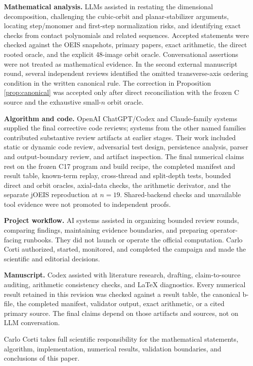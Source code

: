 \documentclass[11pt]{article}
\theoremstyle{definition}
\theoremstyle{remark}
\begin{document}
\textbf{Mathematical analysis.}
LLMs assisted in restating the dimensional decomposition, challenging the
cubic-orbit and planar-stabilizer arguments, locating step/monomer and
first-step normalization risks, and identifying exact checks from contact
polynomials and related sequences.  Accepted statements were checked against
the OEIS snapshots, primary papers, exact arithmetic, the direct rooted oracle,
and the explicit 48-image orbit oracle.  Conversational assertions were not
treated as mathematical evidence.  In the second external manuscript round,
several independent reviews identified the omitted transverse-axis ordering
condition in the written canonical rule.  The correction in Proposition~
\ref{prop:canonical} was accepted only after direct reconciliation with the
frozen C source and the exhaustive small-$n$ orbit oracle.

\textbf{Algorithm and code.}
OpenAI ChatGPT/Codex and Claude-family systems supplied the final corrective
code reviews; systems from the other named families contributed substantive
review artifacts at earlier stages.  Their work included static or dynamic
code review, adversarial test design, persistence analysis, parser and
output-boundary review, and artifact inspection.  The final numerical claims
rest on the frozen C17 program and build recipe, the completed manifest and result table,
known-term replay, cross-thread and split-depth tests, bounded direct and orbit
oracles, axial-data checks, the arithmetic derivator, and the separate jOEIS
reproduction at $n=19$.  Shared-backend checks and unavailable tool evidence
were not promoted to independent proofs.

\textbf{Project workflow.}
AI systems assisted in organizing bounded review rounds, comparing findings,
maintaining evidence boundaries, and preparing operator-facing runbooks.  They
did not launch or operate the official computation.  Carlo Corti authorized,
started, monitored, and completed the campaign and made the scientific and
editorial decisions.

\textbf{Manuscript.}
Codex assisted with literature research, drafting, claim-to-source auditing,
arithmetic consistency checks, and LaTeX diagnostics.  Every numerical result
retained in this revision was checked against a result table, the canonical
b-file, the completed manifest, validator output, exact arithmetic, or a cited
primary source.  The final claims depend on those artifacts and sources, not
on LLM conversation.

Carlo Corti takes full scientific responsibility for the mathematical
statements, algorithm, implementation, numerical results, validation
boundaries, and conclusions of this paper.
\end{document}
